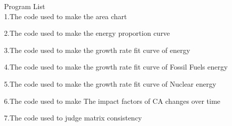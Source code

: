 \documentclass{mcmthesis}
\begin{document}

	
\begin{appendices}
	Program List\\
	1.The code used to make the area chart
	
	
	
	
	
	2.The code used to make the energy proportion curve
	
	3.The code used to make the growth rate fit curve of energy
	
	
	
	
	
	4.The code used to make the growth rate fit curve of Fossil Fuels energy
	
	5.The code used to make the growth rate fit curve of Nuclear energy
	
	6.The code used to make The impact factors of CA changes over time
	
	7.The code used to judge matrix consistency 
	
\end{appendices}
\end{document}
